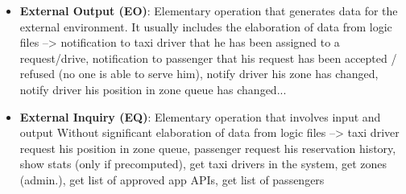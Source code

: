 \begin{itemize}
\item \textbf{External Output (EO)}:
Elementary operation that generates data for the external environment. It usually includes the elaboration of data from logic files -->
notification to taxi driver that he has been assigned to a request/drive, notification to passenger that his request has been accepted / refused (no one is able to serve him), notify driver his zone has changed, notify driver his position in zone queue has changed... 

\item \textbf{External Inquiry (EQ)}:
Elementary operation that involves input and output Without significant elaboration of data from logic files -->
taxi driver request his position in zone queue, passenger request his reservation history, show stats (only if precomputed), get taxi drivers in the system, get zones (admin.), get list of approved app APIs, get list of passengers

\end{itemize}
